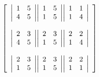 \documentclass[11pt]{article}
\begin{document}
\[
\left[ 
\begin{array}{c@{}c@{}c}
 \left|\begin{array}{cc}
         1 & 5 \\
         4 & 5 \\
  \end{array}\right| & \left|\begin{array}{cc}
        1 & 5 \\
         1 & 5 \\
  \end{array}\right| & \left|\begin{array}{cc}
         1 & 1 \\
         1 & 4 \\
  \end{array}\right| \\
  \\
  
  \left|\begin{array}{cc}
         2 & 3 \\
         4 & 5 \\
  \end{array}\right| & \left|\begin{array}{cc}
         2 & 3 \\
         1 & 5 \\
  \end{array}\right| & \left|\begin{array}{cc}
         2 & 2 \\
         1 & 4 \\
  \end{array}\right|\\
  \\
  
\left|\begin{array}{cc}
         2 & 3 \\
         1 & 5 \\
  \end{array}\right| & \left|\begin{array}{cc}
         2 & 3 \\
         1 & 5 \\
  \end{array}\right| & \left| \begin{array}{cc}
                                   2 & 2 \\
                                   1 & 1 \\
                                  \end{array}\right| \\
\end{array}\right]
\]    
\\
\end{document}
